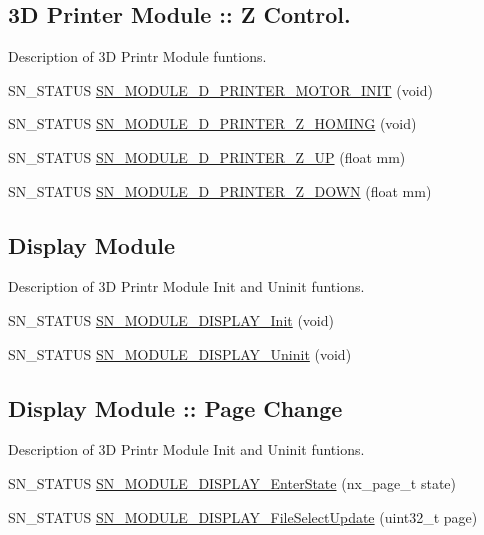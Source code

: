 \subsection*{3D Printer Module \+:\+: Z Control.}
\label{_amgrp0b5aafc53c5099dcb4016e710d2ae272}%
Description of 3D Printr Module funtions. \begin{DoxyCompactItemize}
\item 
S\+N\+\_\+\+S\+T\+A\+T\+US \hyperlink{group__Module_gafc569784fa8758bec7c2f90b1a7f1404}{S\+N\+\_\+\+M\+O\+D\+U\+L\+E\+\_\+D\+\_\+\+P\+R\+I\+N\+T\+E\+R\+\_\+\+M\+O\+T\+O\+R\+\_\+\+I\+N\+IT} (void)
\item 
S\+N\+\_\+\+S\+T\+A\+T\+US \hyperlink{group__Module_gafa7b9a2a41989695e1b881b984794432}{S\+N\+\_\+\+M\+O\+D\+U\+L\+E\+\_\+D\+\_\+\+P\+R\+I\+N\+T\+E\+R\+\_\+\+Z\+\_\+\+H\+O\+M\+I\+NG} (void)
\item 
S\+N\+\_\+\+S\+T\+A\+T\+US \hyperlink{group__Module_ga4671a91d49ef53f67f1d203f18355c63}{S\+N\+\_\+\+M\+O\+D\+U\+L\+E\+\_\+D\+\_\+\+P\+R\+I\+N\+T\+E\+R\+\_\+\+Z\+\_\+\+UP} (float mm)
\item 
S\+N\+\_\+\+S\+T\+A\+T\+US \hyperlink{group__Module_ga5747a0d753cb9d79747db6f4a22b18e9}{S\+N\+\_\+\+M\+O\+D\+U\+L\+E\+\_\+D\+\_\+\+P\+R\+I\+N\+T\+E\+R\+\_\+\+Z\+\_\+\+D\+O\+WN} (float mm)
\end{DoxyCompactItemize}
\subsection*{Display Module}
\label{_amgrp9bc8c99c649c6c3f474df9cfdebdef93}%
Description of 3D Printr Module Init and Uninit funtions. \begin{DoxyCompactItemize}
\item 
S\+N\+\_\+\+S\+T\+A\+T\+US \hyperlink{group__Module_ga894da8d8618a3c3b5bf2533a3a04622c}{S\+N\+\_\+\+M\+O\+D\+U\+L\+E\+\_\+\+D\+I\+S\+P\+L\+A\+Y\+\_\+\+Init} (void)
\item 
S\+N\+\_\+\+S\+T\+A\+T\+US \hyperlink{group__Module_ga91f86811b5f4b83be3296c64ccd253ec}{S\+N\+\_\+\+M\+O\+D\+U\+L\+E\+\_\+\+D\+I\+S\+P\+L\+A\+Y\+\_\+\+Uninit} (void)
\end{DoxyCompactItemize}
\subsection*{Display Module \+:\+: Page Change}
\label{_amgrp76d8551c8543987f9e03f74633dd15d1}%
Description of 3D Printr Module Init and Uninit funtions. \begin{DoxyCompactItemize}
\item 
S\+N\+\_\+\+S\+T\+A\+T\+US \hyperlink{group__Module_ga91ef90fbda58e050514b22a2a564a82d}{S\+N\+\_\+\+M\+O\+D\+U\+L\+E\+\_\+\+D\+I\+S\+P\+L\+A\+Y\+\_\+\+Enter\+State} (nx\+\_\+page\+\_\+t state)
\item 
S\+N\+\_\+\+S\+T\+A\+T\+US \hyperlink{group__Module_gabbde75c3e1a0fe4ffc14492a4e42931b}{S\+N\+\_\+\+M\+O\+D\+U\+L\+E\+\_\+\+D\+I\+S\+P\+L\+A\+Y\+\_\+\+File\+Select\+Update} (uint32\+\_\+t page)
\end{DoxyCompactItemize}
